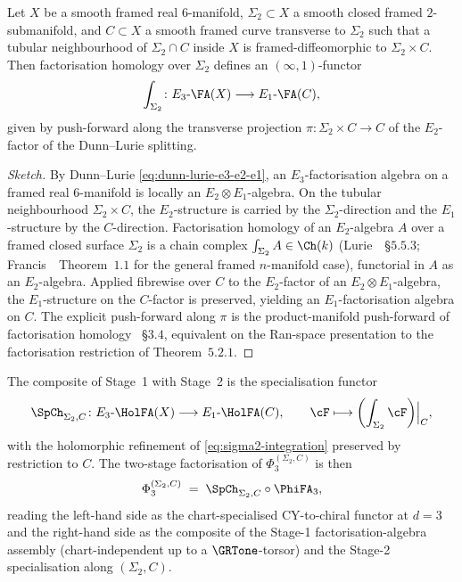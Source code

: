 \begin{proposition}
\label{prop:fa-transverse-integration}
Let $X$ be a smooth framed real $6$-manifold, $\Sigma_2 \subset X$ a
smooth closed framed $2$-submanifold, and $C \subset X$ a smooth framed
curve transverse to $\Sigma_2$ such that a tubular neighbourhood of
$\Sigma_2 \cap C$ inside $X$ is framed-diffeomorphic to
$\Sigma_2 \times C$. Then factorisation homology over $\Sigma_2$
defines an $(\infty, 1)$-functor
\begin{equation}
\label{eq:sigma2-integration}
 \int_{\Sigma_2} \colon E_3\text{-}\FA(X) \longrightarrow
 E_1\text{-}\FA(C),
\end{equation}
given by push-forward along the transverse projection
$\pi \colon \Sigma_2 \times C \to C$ of the $E_2$-factor of the
Dunn--Lurie splitting.
\end{proposition}

\begin{proof}[Sketch]
By Dunn--Lurie \eqref{eq:dunn-lurie-e3-e2-e1}, an
$E_3$-factorisation algebra on a framed real $6$-manifold is locally an
$E_2 \otimes E_1$-algebra. On the tubular neighbourhood $\Sigma_2
\times C$, the $E_2$-structure is carried by the $\Sigma_2$-direction
and the $E_1$-structure by the $C$-direction. Factorisation homology
of an $E_2$-algebra $A$ over a framed closed surface $\Sigma_2$ is a
chain complex $\int_{\Sigma_2} A \in \Ch(k)$
(Lurie~\cite{LurieHA}~\S$5.5.3$; Francis~\cite{Francis2013}~Theorem~$1.1$
for the general framed $n$-manifold case), functorial in $A$ as an
$E_2$-algebra. Applied fibrewise over $C$ to the $E_2$-factor of an
$E_2 \otimes E_1$-algebra, the $E_1$-structure on the $C$-factor is
preserved, yielding an $E_1$-factorisation algebra on $C$. The
explicit push-forward along $\pi$ is the product-manifold push-forward
of factorisation homology \cite{Francis2013}~\S$3.4$, equivalent on
the Ran-space presentation to the factorisation restriction of
\cite{FrancisGaitsgory2012} Theorem~$5.2.1$.
\end{proof}

The composite of Stage~1 with Stage~2 is the specialisation functor
\begin{equation}
\label{eq:spch-definition}
 \SpCh_{\Sigma_2, C} \colon E_3\text{-}\HolFA(X) \longrightarrow
 E_1\text{-}\HolFA(C),
 \qquad
 \cF \longmapsto \biggl(\int_{\Sigma_2} \cF\biggr) \Bigr|_{C},
\end{equation}
with the holomorphic refinement of \eqref{eq:sigma2-integration}
preserved by restriction to $C$. The two-stage factorisation of
$\Phi_3^{(\Sigma_2, C)}$ is then
\begin{equation}
\label{eq:phi3-two-stage}
 \Phi_3^{(\Sigma_2, C)} \;=\; \SpCh_{\Sigma_2, C} \circ \PhiFA_3,
\end{equation}
reading the left-hand side as the chart-specialised CY-to-chiral
functor at $d = 3$ and the right-hand side as the composite of the
Stage-1 factorisation-algebra assembly (chart-independent up to a
$\GRTone$-torsor) and the Stage-2 specialisation along $(\Sigma_2, C)$.

